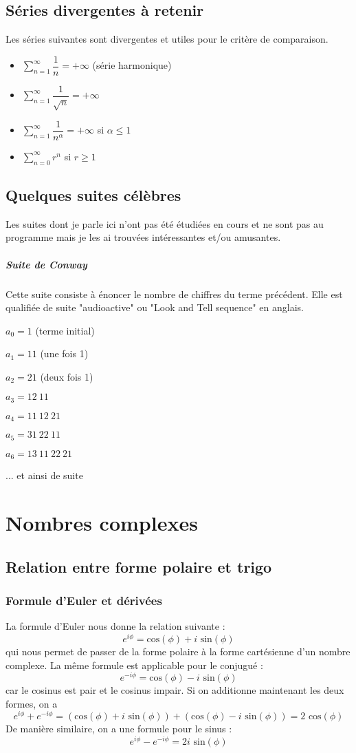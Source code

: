 \documentclass[10pt,a4paper]{book}
\begin{document}
\section{Séries divergentes à retenir}
Les séries suivantes sont divergentes et utiles pour le critère de comparaison.
\begin{itemize}
\item $\sum_{n=1}^\infty \dfrac{1}{n} = +\infty$ (série harmonique)
\item $\sum_{n=1}^\infty \dfrac{1}{\sqrt{n}} = +\infty$
\item $\sum_{n=1}^\infty \dfrac{1}{n^\alpha} = +\infty$ si $\alpha\leq 1$
\item $\sum_{n=0}^\infty r^n$ si $r\geq 1$
\end{itemize}

\section{Quelques suites célèbres}
Les suites dont je parle ici n'ont pas été étudiées en cours et ne sont pas au programme mais je les ai trouvées intéressantes et/ou amusantes.
\paragraph{Suite de Conway}
Cette suite consiste à énoncer le nombre de chiffres du terme précédent.  Elle est qualifiée de suite "audioactive" ou "Look and Tell sequence" en anglais.\par 
$a_0 = 1$ (terme initial)\par 
$a_1 = 11$ (une fois 1)\par
$a_2 = 21$ (deux fois 1)\par 
$a_3 = 12\ 11$\par 
$a_4 = 11\ 12\ 21$\par 
$a_5 = 31\ 22\ 11$\par 
$a_6 = 13\ 11\ 22\ 21$\par 
... et ainsi de suite

\chapter{Nombres complexes}
\section{Relation entre forme polaire et trigo}
\subsection{Formule d'Euler et dérivées}
La formule d'Euler nous donne la relation suivante :
\[e^{i\phi} = \text{cos}(\phi)+i\text{ sin}(\phi)\]
qui nous permet de passer de la forme polaire à la forme cartésienne d'un nombre complexe. La même formule est applicable pour le conjugué :
\[e^{-i\phi} = \text{cos}(\phi)-i\text{ sin}(\phi)\]
car le cosinus est pair et le cosinus impair. Si on additionne maintenant les deux formes, on a
\[e^{i\phi}+e^{-i\phi} = (\text{cos}(\phi) + i\text{ sin}(\phi)) + (\text{cos}(\phi) - i\text{ sin}(\phi)) = 2\text{ cos}(\phi)\]
De manière similaire, on a une formule pour le sinus :
\[e^{i\phi}-e^{-i\phi} = 2i\text{ sin}(\phi)\]
\end{document}
